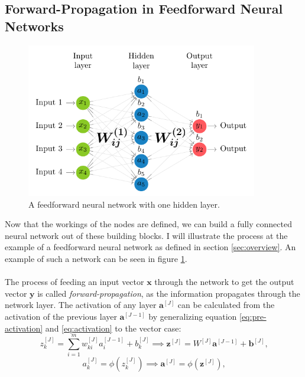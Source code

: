 \subsection{Forward-Propagation in Feedforward Neural Networks}
\label{subsec:forward-propagation}
\begin{figure}
    \centering
    \includegraphics[width=0.9\textwidth]{nn}
    \caption{A feedforward neural network with one hidden layer.}
    \label{fig:nn}
\end{figure}
Now that the workings of the nodes are defined, we can build a fully connected neural network out of these building blocks.
I will illustrate the process at the example of a feedforward neural network as defined in section \ref{sec:overview}.
An example of such a network can be seen in figure \ref{fig:nn}.
\\
\\
The process of feeding an input vector $\bm{x}$ through the network to get the output vector $\bm{y}$ is called \textit{forward-propagation}, as the information propagates through the network layer.
The activation of any layer $\bm{a}^{[J]}$ can be calculated from the activation of the previous layer $\bm{a}^{[J-1]}$ by generalizing equation \ref{eq:pre-activation} and \ref{eq:activation} to the vector case:
\begin{equation}
    z_k^{[J]} = \sum_{i=1}^{m} w_{ki}^{[J]} a_i^{[J-1]} + b_k^{[J]} \implies \bm{z}^{[J]} = W^{[J]} \bm{a}^{[J-1]} + \bm{b}^{[J]} \text{,}
    \label{eq:pre-activation-vector}
\end{equation}
\begin{equation}
    a_k^{[J]} = \phi(z_k^{[J]}) \implies \bm{a}^{[J]} = \phi(\bm{z}^{[J]}) \text{,}
    \label{eq:activation-vector}
\end{equation}
